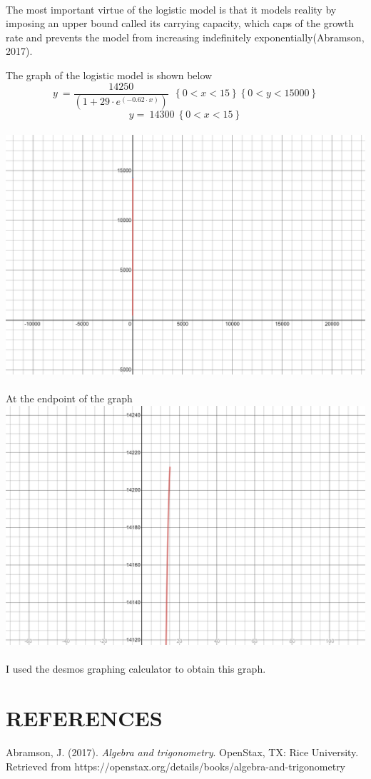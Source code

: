 \documentclass{article}
\begin{document}
\\The most important virtue of the logistic model is that it models reality by imposing an upper bound called its carrying capacity, which caps of the growth rate and prevents the model from increasing indefinitely exponentially(Abramson, 2017). 



The graph of the logistic model is shown below\\
$${y\ =\frac{14250}{\left(1+29\cdot e^{\left(-0.62\cdot x\right)}\right)}\ \ \left\{0<x<15\right\}\left\{0<y<15000\right\}}$$
$${y=\ 14300\ \left\{0<x<15\right\}}$$
\\\includegraphics[scale = 0.1]{p1}\\
\\At the endpoint of the graph
\\\includegraphics[scale = 0.1]{p2}\\
\\I used the desmos graphing calculator to obtain this graph.
\section*{REFERENCES}
Abramson, J. (2017). \textit{Algebra and trigonometry}. OpenStax, TX: Rice University. Retrieved
from https://openstax.org/details/books/algebra-and-trigonometry
\end{document}
